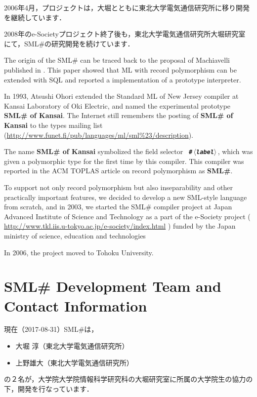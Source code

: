 \documentclass{jbook}
\newcommand{\txt}[2]{#2}
\newcommand{\smlsharp}{SML\#}
\newcommand{\releaseDate}{2017-08-31}
\newcommand{\nonterm}[1]{\mbox{$\,\langle$}{\it #1}\mbox{$\rangle\,$}}
\begin{document}
2006年4月，プロジェクトは，大堀とともに東北大学電気通信研究所に移り開発
を継続しています．

2008年のe-Societyプロジェクト終了後も，東北大学電気通信研究所大堀研究室
にて，\smlsharp{}の研究開発を続けています．

\else%
	The origin of the \smlsharp{} can be traced back to the proposal
of Machiavelli published in \cite{ohor89sigmod}.
	This paper showed that ML with record polymorphism can be
extended with SQL and reported a implementation of a prototype interpreter. 

	In 1993, Atsushi Ohori extended the Standard ML of New Jersey
compiler at Kansai Laboratory of Oki Electric, and named the
experimental prototype {\bf SML\# of Kansai}.
	The Internet still remembers the posting of {\bf SML\# of
Kansai} to the types mailing list  
(\url{http://www.funet.fi/pub/languages/ml/sml%23/description}).

	The name {\bf SML\# of Kansai} symbolized the field selector {\bf\tt
\#\nonterm{label}}, which was given a polymorphic type for the first
time by this compiler.
	This compiler was reported in the ACM TOPLAS article on record
polymorphism \cite{ohor95toplas} as {\bf \smlsharp{}}.

	To support not only record polymorphism but also
inseparability and other practically important features, we decided 
to develop a new SML-style language from scratch, and in 2003, we
started the \smlsharp{} compiler project at Japan Advanced Institute of 
Science and Technology as a part of the e-Society project 
(
\url{http://www.tkl.iis.u-tokyo.ac.jp/e-society/index.html}
)
funded by the Japan ministry of science, education and technologies

	In 2006, the project moved to Tohoku University.
\fi%

\section{
\txt{\smlsharp{}開発チームと連絡先情報}
{\smlsharp{} Development Team and Contact Information}
}
\label{sec:smlsharpTeam}

\ifjp%
	現在（\releaseDate）\smlsharp{}は，
\begin{itemize}
\item 
大堀 淳（東北大学電気通信研究所）
\item 
上野雄大（東北大学電気通信研究所）
\end{itemize}
の２名が，大学院大学院情報科学研究科の大堀研究室に所属の大学院生の協力の
下，開発を行なっています．
\end{document}
